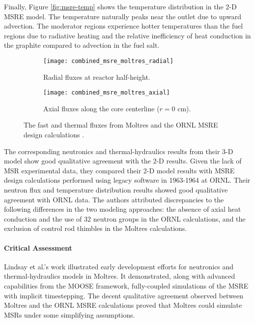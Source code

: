 Finally, Figure \ref{fig:msre-temp}
shows the temperature distribution in the 2-D \gls{MSRE} model. The temperature
naturally peaks near the outlet due to upward advection. The moderator regions
experience hotter temperatures than the fuel regions due to radiative heating
and the relative inefficiency of heat conduction in the graphite compared to
advection in the fuel salt.

\begin{figure}[htb!]
	\centering
	\begin{subfigure}[h]{0.45\columnwidth}
	    \texttt{[image: combined\_msre\_moltres\_radial]}
	    \caption{Radial fluxes at reactor half-height.}
	    \label{fig:msre-flux-radial}
	\end{subfigure}
	\hfill
	\begin{subfigure}[h]{0.45\columnwidth}
	    \texttt{[image: combined\_msre\_moltres\_axial]}
	    \caption{Axial fluxes along the core centerline ($r=0$ cm).}
	    \label{fig:msre-flux-axial}
	\end{subfigure}
	\caption{The fast and thermal fluxes from
	Moltres \cite{lindsay_introduction_2018} and the \gls{ORNL} \gls{MSRE}
	design calculations \cite{briggs_molten-salt_1964}.}
\end{figure}

The corresponding neutronics and thermal-hydraulics results from their 3-D model
show good qualitative agreement with the 2-D results. Given the lack of
\gls{MSR} experimental data, they compared their 2-D model results with
\gls{MSRE} design calculations performed using legacy software in 1963-1964 at
\gls{ORNL}. Their neutron flux and temperature distribution results showed good
qualitative agreement with \gls{ORNL} data. The authors attributed
discrepancies to the following differences in the two modeling approaches: the
absence of axial heat conduction and the use of 32 neutron groups in the
\gls{ORNL} calculations, and the exclusion of control rod thimbles in the
Moltres calculations.

\paragraph{Critical Assessment} \label{sec:msre-critique}

Lindsay et al.'s work illustrated early development efforts for neutronics and thermal-hydraulics
models in Moltres. It demonstrated, along with advanced capabilities from the \gls{MOOSE}
framework, fully-coupled simulations of the \gls{MSRE} with implicit timestepping. The
decent qualitative agreement observed between Moltres and the \gls{ORNL}
\gls{MSRE} calculations proved that Moltres could simulate
\glspl{MSR} under some simplifying assumptions.

